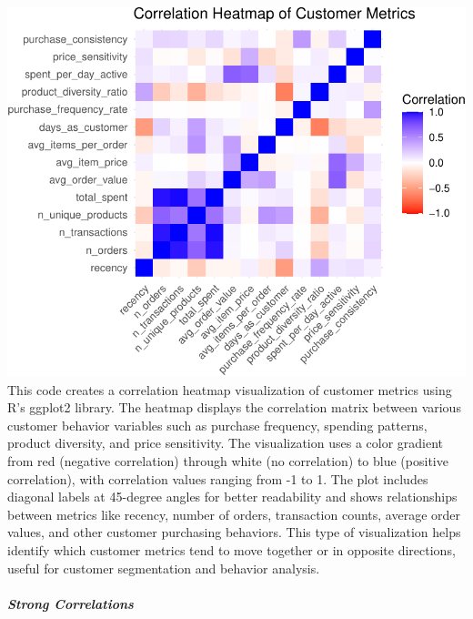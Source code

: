 \documentclass[
]{article}
\begin{document}
\includegraphics{capstone_customer_segmentation_files/figure-latex/correlation-analysis4-1.pdf}
This code creates a correlation heatmap visualization of customer
metrics using R's ggplot2 library. The heatmap displays the correlation
matrix between various customer behavior variables such as purchase
frequency, spending patterns, product diversity, and price sensitivity.
The visualization uses a color gradient from red (negative correlation)
through white (no correlation) to blue (positive correlation), with
correlation values ranging from -1 to 1. The plot includes diagonal
labels at 45-degree angles for better readability and shows
relationships between metrics like recency, number of orders,
transaction counts, average order values, and other customer purchasing
behaviors. This type of visualization helps identify which customer
metrics tend to move together or in opposite directions, useful for
customer segmentation and behavior analysis.\newpage

\subparagraph{Strong Correlations}\label{strong-correlations}
\end{document}
